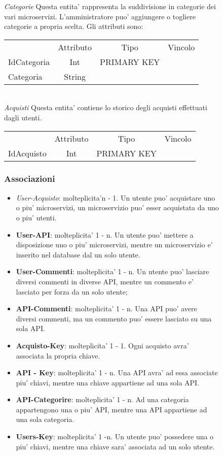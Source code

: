 {{\begin{figure}[ht]
			\textit{Categorie}
			Questa entita' rappresenta la suddivisione in categorie dei vari microservizi. L'amministratore puo' aggiungere o togliere categorie a propria scelta. Gli attributi sono: 
			\begin{center}
			\begin{tabular}{lccc}
				&Attributo&Tipo&Vincolo\\
				IdCategoria&Int&PRIMARY KEY\\
				Categoria&String& \\			
			\end{tabular}
			\end{center}\\
			
			\textit{Acquisti}
			Questa entita' contiene lo storico degli acquisti effettuati dagli utenti.
			\begin{center}
			\begin{tabular}{lccc}
				&Attributo&Tipo&Vincolo\\
				IdAcquisto&Int&PRIMARY KEY\\
			\end{tabular}
			\end{center}
	\subsubsection{Associazioni}
		\begin{itemize}
			\item\textit{User-Acquisto}: molteplicita'n - 1. Un utente puo' acquistare uno o piu' microservizi, un microservizio puo' esser acquistata da uno o piu' utenti.
			\item\textbf{User-API}: molteplicita' 1 - n. Un utente puo' mettere a disposizione uno o piu' microservizi, mentre un microservizio e' inserito nel database dal un solo utente.
			\item\textbf{User-Commenti}: molteplicita' 1 - n. Un utente puo' lasciare diversi commenti in diverse API, mentre un commento e' lasciato per forza da un solo utente;
			\item\textbf{API-Commenti}: molteplicita' 1 - n. Una API puo' avere diversi commenti, ma un commento puo' essere lasciato su una sola API.	
			\item\textbf{Acquisto-Key}: molteplicita' 1 - 1. Ogni acquisto avra' associata la propria chiave. 
			\item\textbf{API - Key}: molteplicita' 1 - n. Una API avra' ad essa associate piu' chiavi, mentre una chiave appartiene ad una sola API.
			\item\textbf{API-Categorire}: molteplicita' 1 - n. Ad una categoria appartengono una o piu' API, mentre una API appartiene ad una sola categoria.
			\item\textbf{Users-Key}: molteplicita' 1 -n. Un utente puo' possedere una o piu' chiavi, mentre una chiave sara' associata ad un solo utente.
		\end{itemize}				
								

\end{figure}}}
